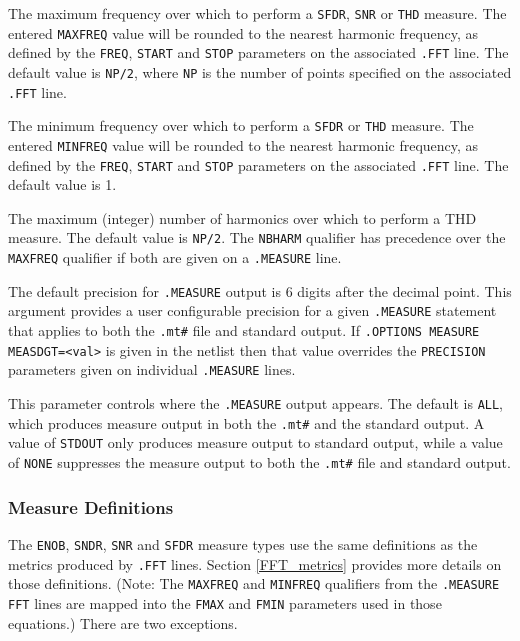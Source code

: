 \begin{Command}
\begin{Arguments}
The maximum frequency over which to perform a {\tt SFDR}, {\tt SNR}
or {\tt THD} measure. The entered {\tt MAXFREQ} value will be rounded
to the nearest harmonic frequency, as defined by the {\tt FREQ},
{\tt START} and {\tt STOP} parameters on the associated {\tt .FFT}
line.  The default value is {\tt NP/2}, where {\tt NP} is the number
of points specified on the associated {\tt .FFT} line.

The minimum frequency over which to perform a {\tt SFDR} or {\tt THD} measure.
The entered {\tt MINFREQ} value will be rounded to the nearest harmonic
frequency, as defined by the {\tt FREQ}, {\tt START} and {\tt STOP}
parameters on the associated {\tt .FFT} line.  The default value is 1.

The maximum (integer) number of harmonics over which to perform a THD measure.
The default value is {\tt NP/2}.  The {\tt NBHARM} qualifier has precedence
over the {\tt MAXFREQ} qualifier if both are given on a {\tt .MEASURE} line.


The default precision for {\tt .MEASURE} output is 6 digits after the
decimal point.  This argument provides a user configurable precision
for a given {\tt .MEASURE} statement that applies to both the
\texttt{.mt\#} file and standard output.
If \texttt{.OPTIONS MEASURE MEASDGT=<val>} is given in the netlist
then that value overrides the \texttt{PRECISION} parameters given on
individual \texttt{.MEASURE} lines.


This parameter controls where the {\tt .MEASURE} output appears.  The
default is {\tt ALL}, which produces measure output in both the
\texttt{.mt\#} and the standard output.  A value of {\tt STDOUT}
only produces measure output to standard output, while a value of
{\tt NONE} suppresses the measure output to both the \texttt{.mt\#}
file and standard output.

\end{Arguments}

\end {Command}

\subsubsection{Measure Definitions}
The \texttt{ENOB}, \texttt{SNDR}, \texttt{SNR} and \texttt{SFDR} measure
types use the same definitions as the metrics produced by \texttt{.FFT} lines.
Section \ref{FFT_metrics} provides more details on those definitions.  (Note: The
\texttt{MAXFREQ} and \texttt{MINFREQ} qualifiers from the \texttt{.MEASURE FFT}
lines are mapped into the \texttt{FMAX} and \texttt{FMIN} parameters used in those
equations.)  There are two exceptions.

